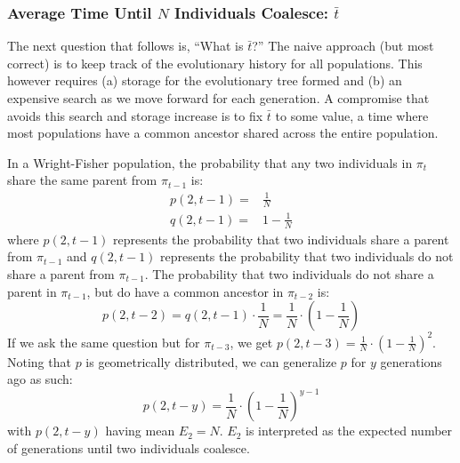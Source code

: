 \subsubsection{Average Time Until $N$ Individuals Coalesce: $\bar{t}$}
The next question that follows is, ``What is $\bar{t}$?''
The naive approach (but most correct) is to keep track of the evolutionary history for all populations.
This however requires (a) storage for the evolutionary tree formed and (b) an expensive search as we move forward for
each generation.
A compromise that avoids this search and storage increase is to fix $\bar{t}$ to some value, a time where most
populations have a common ancestor shared across the entire population.

In a Wright-Fisher population, the probability that any two individuals in $\pi_t$ share the same parent from
$\pi_{t-1}$ is:
\begin{equation}
    \begin{aligned}
        p(2, t-1) =& \frac{1}{N} \\
        q(2, t-1) =& 1 - \frac{1}{N}
    \end{aligned}
\end{equation}
where $p(2, t-1)$ represents the probability that two individuals share a parent from $\pi_{t-1}$ and
$q(2, t-1)$ represents the probability that two individuals do not share a parent from $\pi_{t-1}$.
The probability that two individuals do not share a parent in $\pi_{t-1}$, but do have a common ancestor
in $\pi_{t-2}$ is:
\begin{equation}
    p(2, t-2) = q(2, t-1) \cdot \frac{1}{N} = \frac{1}{N} \cdot \left(1 - \frac{1}{N}\right)
\end{equation}
If we ask the same question but for $\pi_{t-3}$, we get $p(2, t-3) = \frac{1}{N} \cdot  \left(1 - \frac{1}{N}\right)^2$.
Noting that $p$ is geometrically distributed, we can generalize $p$ for $y$ generations ago as such:
\begin{equation}
    p(2, t-y) = \frac{1}{N} \cdot \left(1 - \frac{1}{N}\right)^{y-1}
\end{equation}
with $p(2, t-y)$ having mean $E_2 = N$.
$E_2$ is interpreted as the expected number of generations until two individuals coalesce.

